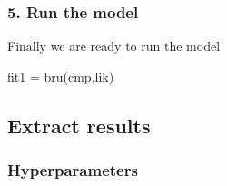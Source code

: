 \documentclass[
  letterpaper,
  DIV=11,
  numbers=noendperiod]{scrartcl}
\newenvironment{Shaded}{\begin{snugshade}}{\end{snugshade}}
\newcommand{\FunctionTok}[1]{\textcolor[rgb]{0.28,0.35,0.67}{#1}}
\newcommand{\NormalTok}[1]{\textcolor[rgb]{0.00,0.23,0.31}{#1}}
\newcommand{\OtherTok}[1]{\textcolor[rgb]{0.00,0.23,0.31}{#1}}
\begin{document}
\subsubsection{5. Run the model}\label{run-the-model}

Finally we are ready to run the model

\begin{Shaded}
\begin{Highlighting}[]
\NormalTok{fit1 }\OtherTok{=} \FunctionTok{bru}\NormalTok{(cmp,lik)}
\end{Highlighting}
\end{Shaded}

\subsection{Extract results}\label{extract-results}

\subsubsection{Hyperparameters}\label{hyperparameters}
\end{document}

